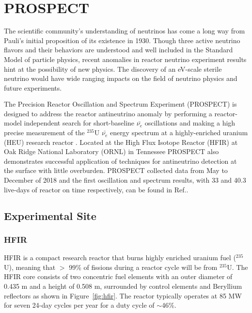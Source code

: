 \chapter{PROSPECT}

The scientific community's understanding of neutrinos has come a long way from Pauli's initial proposition of its existence in 1930. 
Though three active neutrino flavors and their behaviors are understood and well included in the Standard Model of particle physics, recent anomalies in reactor neutrino experiment results hint at the possibility of new physics. 
The discovery of an eV-scale sterile neutrino would have wide ranging impacts on the field of neutrino physics and future experiments.

The Precision Reactor Oscillation and Spectrum Experiment (PROSPECT) is designed to address the reactor antineutrino anomaly by performing a reactor-model independent search for short-baseline $\bar{\nu_{e}}$ oscillations and making a high precise measurement of the $^{235}$U $\bar{\nu_{e}}$ energy spectrum at a highly-enriched uranium (HEU) research reactor \cite{LongNIM}.
Located at the High Flux Isotope Reactor (HFIR) at Oak Ridge National Laboratory (ORNL) in Tennessee PROSPECT also demonstrates successful application of techniques for antineutrino detection at the surface with little overburden. 
PROSPECT collected data from May to December of 2018 and the first oscillation and spectrum results, with 33 and 40.3 live-days of reactor on time respectively, can be found in Ref.\cite{PhysRevLett.121.251802,Ashenfelter:2018jrx}.

\section{Experimental Site}
\subsection{HFIR}

HFIR is a compact research reactor that burns highly enriched uranium fuel ($^{235}$U), meaning that $>$ 99\% of fissions during a reactor cycle will be from $^{235}$U.
The HFIR core consists of two concentric fuel elements with an outer diameter of 0.435 m and a height of 0.508 m, surrounded by control elements and Beryllium reflectors as shown in Figure~\ref{fig:hfir}. 
The reactor typically operates at 85 MW for seven 24-day cycles per year for a duty cycle of $\sim$46\%.

